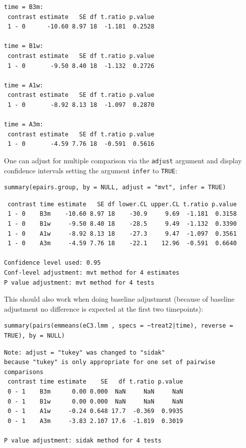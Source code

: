 \documentclass[12pt]{article}
\begin{document}
\begin{verbatim}
time = B3m:
 contrast estimate   SE df t.ratio p.value
 1 - 0      -10.60 8.97 18  -1.181  0.2528

time = B1w:
 contrast estimate   SE df t.ratio p.value
 1 - 0       -9.50 8.40 18  -1.132  0.2726

time = A1w:
 contrast estimate   SE df t.ratio p.value
 1 - 0       -8.92 8.13 18  -1.097  0.2870

time = A3m:
 contrast estimate   SE df t.ratio p.value
 1 - 0       -4.59 7.76 18  -0.591  0.5616
\end{verbatim}

One can adjust for multiple comparison via the \texttt{adjust} argument and
display confidence intervals setting the argument \texttt{infer} to \texttt{TRUE}:
\lstset{language=r,label= ,caption= ,captionpos=b,numbers=none}
\begin{lstlisting}
summary(epairs.group, by = NULL, adjust = "mvt", infer = TRUE)
\end{lstlisting}

\begin{verbatim}
 contrast time estimate   SE df lower.CL upper.CL t.ratio p.value
 1 - 0    B3m    -10.60 8.97 18    -30.9     9.69  -1.181  0.3158
 1 - 0    B1w     -9.50 8.40 18    -28.5     9.49  -1.132  0.3390
 1 - 0    A1w     -8.92 8.13 18    -27.3     9.47  -1.097  0.3561
 1 - 0    A3m     -4.59 7.76 18    -22.1    12.96  -0.591  0.6640

Confidence level used: 0.95 
Conf-level adjustment: mvt method for 4 estimates 
P value adjustment: mvt method for 4 tests
\end{verbatim}


This should also work when doing baseline adjustment (because of
baseline adjustment no difference is expected at the first two
timepoints):
\lstset{language=r,label= ,caption= ,captionpos=b,numbers=none}
\begin{lstlisting}
summary(pairs(emmeans(eC3.lmm , specs = ~treat2|time), reverse = TRUE), by = NULL)
\end{lstlisting}

\begin{verbatim}
Note: adjust = "tukey" was changed to "sidak"
because "tukey" is only appropriate for one set of pairwise comparisons
 contrast time estimate    SE   df t.ratio p.value
 0 - 1    B3m      0.00 0.000  NaN     NaN     NaN
 0 - 1    B1w      0.00 0.000  NaN     NaN     NaN
 0 - 1    A1w     -0.24 0.648 17.7  -0.369  0.9935
 0 - 1    A3m     -3.83 2.107 17.6  -1.819  0.3019

P value adjustment: sidak method for 4 tests
\end{verbatim}
\end{document}
